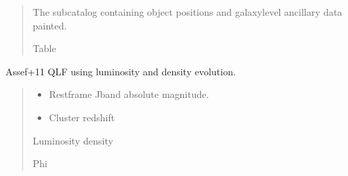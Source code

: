 \documentclass[letterpaper,12pt,english]{sphinxmanual}
\begin{document}
\begin{fulllineitems}
\begin{fulllineitems}
\begin{quote}
\begin{description}
\begin{itemize}
\end{itemize}

\sphinxAtStartPar
The sub\sphinxhyphen{}catalog containing object positions and galaxy\sphinxhyphen{}level ancillary data painted.

\sphinxAtStartPar
Table

\end{description}\end{quote}

\end{fulllineitems}


\begin{fulllineitems}
\label{\detokenize{api/mock:SPTclIRAGN.Mock_Generation.MockIRAGN._luminosity_function}}
\pysigstartsignatures
{}
\pysigstopsignatures
\sphinxAtStartPar
Assef+11 QLF using luminosity and density evolution.
\begin{quote}\begin{description}
\begin{itemize}
\item {} 
\sphinxAtStartPar
{} \textendash{} Rest\sphinxhyphen{}frame J\sphinxhyphen{}band absolute magnitude.

\item {} 
\sphinxAtStartPar
{} \textendash{} Cluster redshift

\end{itemize}

\sphinxAtStartPar
Luminosity density

\sphinxAtStartPar
Phi

\end{description}\end{quote}


\end{fulllineitems}
\end{fulllineitems}
\end{document}
